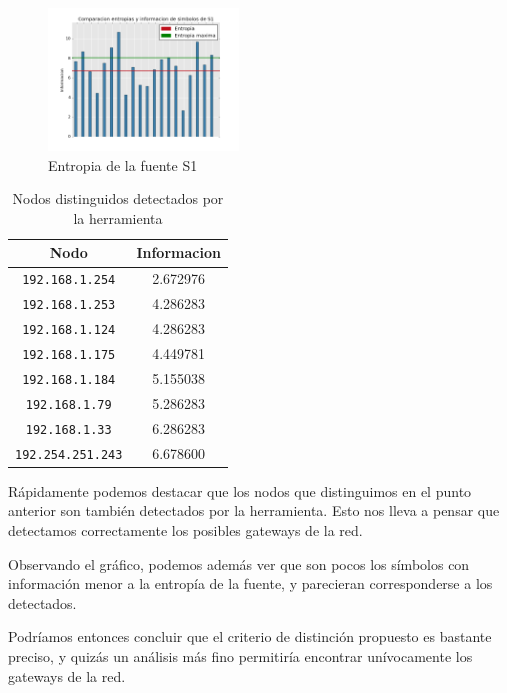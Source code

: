 \begin{figure}[H]
  \centering
    \includegraphics[width=0.45\textwidth]{agutter/gr2.png}
  \caption{Entropia de la fuente S1}
  \label{entropia-s1-agutter}
\end{figure}

\begin{table}[H]\begin{center} %
  \begin{tabular}{|c|c|}
    \hline
    \textbf{Nodo} & \textbf{Informacion} \\ \hline
    \texttt{192.168.1.254}& 2.672976 \\ \hline
    \texttt{192.168.1.253}& 4.286283 \\ \hline
    \texttt{192.168.1.124}& 4.286283 \\ \hline
    \texttt{192.168.1.175}& 4.449781 \\ \hline
    \texttt{192.168.1.184}& 5.155038 \\ \hline
    \texttt{192.168.1.79}& 5.286283 \\ \hline
    \texttt{192.168.1.33}& 6.286283 \\ \hline
    \texttt{192.254.251.243}& 6.678600 \\ \hline
  \end{tabular}
  \caption{Nodos distinguidos detectados por la herramienta}
  \label{Nodos-distinguidos-agutter}
\end{center}\end{table}

R\'apidamente podemos destacar que los nodos que distinguimos en el punto anterior son tambi\'en detectados
por la herramienta. Esto nos lleva a pensar que detectamos correctamente los posibles gateways de la red.

Observando el gr\'afico, podemos adem\'as ver que son pocos los s\'imbolos con informaci\'on menor a la
entrop\'ia de la fuente, y parecieran corresponderse a los detectados.

Podr\'iamos entonces concluir que el criterio de distinci\'on propuesto es bastante preciso, y quiz\'as
un an\'alisis m\'as fino permitir\'ia encontrar un\'ivocamente los gateways de la red.
